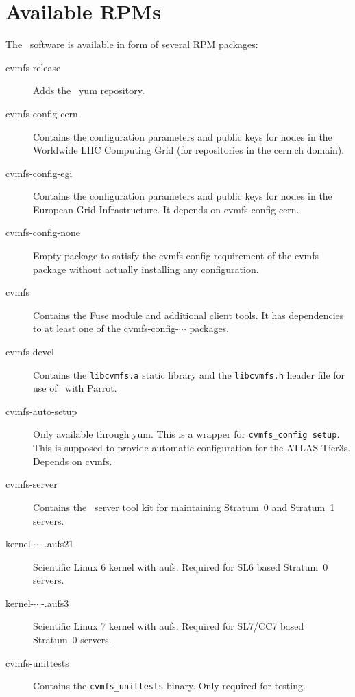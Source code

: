 \chapter{Available RPMs}
\label{apx:rpms}

The \cvmfs\ software is available in form of several RPM packages:
\begin{description}
	\item[cvmfs-release] Adds the \cvmfs\ yum repository.
	\item[cvmfs-config-cern] Contains the configuration parameters and public keys for nodes in the Worldwide LHC Computing Grid (\ie for repositories in the cern.ch domain).
	\item[cvmfs-config-egi] Contains the configuration parameters and public keys for nodes in the European Grid Infrastructure.  It depends on cvmfs-config-cern.
	\item[cvmfs-config-none] Empty package to satisfy the cvmfs-config requirement of the cvmfs package without actually installing any configuration.
	\item[cvmfs] Contains the Fuse module and additional client tools.  It has dependencies to at least one of the cvmfs-config-$\cdots$ packages.
	\item[cvmfs-devel] Contains the \texttt{libcvmfs.a} static library and the \texttt{libcvmfs.h} header file for use of \cvmfs\ with Parrot\cite{parrot05}.
	\item[cvmfs-auto-setup] Only available through yum. 
		This is a wrapper for \texttt{cvmfs\_config setup}. 
		This is supposed to provide automatic configuration for the ATLAS Tier3s.
		Depends on cvmfs.
	\item[cvmfs-server] Contains the \cvmfs\ server tool kit for maintaining Stratum~0 and Stratum~1 servers.
	\item[kernel-$\cdots$-.aufs21] Scientific Linux 6 kernel with aufs.
		Required for SL6 based Stratum~0 servers.
	\item[kernel-$\cdots$-.aufs3] Scientific Linux 7 kernel with aufs.
		Required for SL7/CC7 based Stratum~0 servers.
	\item[cvmfs-unittests] Contains the \texttt{cvmfs\_unittests} binary.  Only required for testing.
\end{description}
